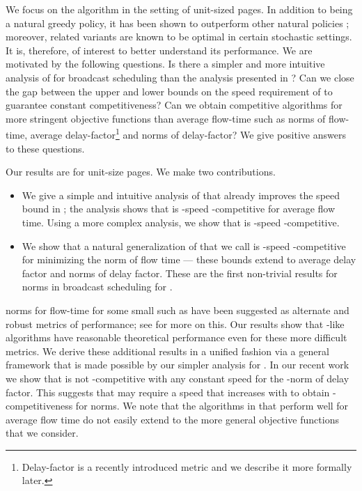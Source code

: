 \documentclass[11pt]{article}
\begin{document}
\begin{titlepage}
We focus on the  algorithm in the setting of unit-sized
pages. In addition to being a natural greedy policy, it has been shown
to outperform other natural policies \cite{AksoyF98}; moreover,
related variants are known to be optimal in certain stochastic
settings.  It is, therefore, of interest to better understand its
performance. We are motivated by the following questions. Is there a
simpler and more intuitive analysis of  for broadcast scheduling
than the analysis presented in \cite{EdmondsP04}?  Can we close the
gap between the upper and lower bounds on the speed requirement of
 to guarantee constant competitiveness?  Can we obtain
competitive algorithms for more stringent objective functions than
average flow-time such as  norms of flow-time, average
delay-factor\footnote{Delay-factor is a recently introduced metric and
  we describe it more formally later.}  and  norms of
delay-factor? We give positive answers to these questions.

\medskip
{} Our results are for unit-size pages. We make two
contributions.
\begin{itemize}
\item We give a simple and intuitive analysis of  that already
  improves the speed bound in \cite{EdmondsP04}; the analysis shows
  that  is -speed -competitive for
  average flow time. Using a more complex analysis, we show that
   is -speed -competitive.
\item We show that a natural generalization of  that we call
   is -speed -competitive for minimizing the 
  norm of flow time --- these bounds extend to average delay
  factor and  norms of delay factor. These are the first
  non-trivial results for  norms in broadcast scheduling for .
\end{itemize}
 norms for flow-time for some small  such as  have
been suggested as alternate and robust metrics of performance; see
\cite{BansalP03,Pruhs07} for more on this. Our results show that
-like algorithms have reasonable theoretical performance even
for these more difficult metrics. We derive these additional results
in a unified fashion via a general framework that is made possible by
our simpler analysis for . In our recent work \cite{ChekuriIM09}
we show that  is not -competitive with any constant speed
for the -norm of delay factor. This suggests that 
may require a speed that increases with  to obtain
-competitiveness for  norms. We note that the algorithms in
\cite{EdmondsP03,EdmondsP09} that perform well for average flow time
do not easily extend to the more general objective functions that we
consider.


\end{titlepage}
\end{document}
